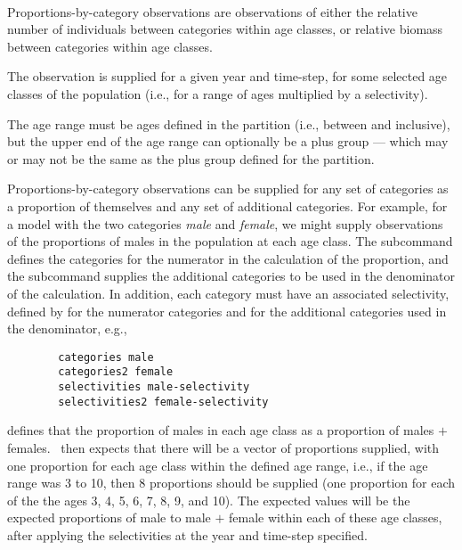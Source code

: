\paragraph*{\label{sec:proportions-by-category}}
Proportions-by-category observations are observations of either the relative number of individuals between categories within age classes, or relative biomass between categories within age classes. 

The observation is supplied for a given year and time-step, for some selected age classes of the population (i.e., for a range of ages multiplied by a selectivity).

The age range must be ages defined in the partition (i.e., between  and  inclusive), but the upper end of the age range can optionally be a plus group --- which may or may not be the same as the plus group defined for the partition. 

Proportions-by-category observations can be supplied for any set of categories as a proportion of themselves and any set of additional categories. For example, for a model with the two categories \emph{male} and \emph{female}, we might supply observations of the proportions of males in the population at each age class. The subcommand  defines the categories for the numerator in the calculation of the proportion, and the subcommand  supplies the additional categories to be used in the denominator of the calculation. In addition, each category must have an associated selectivity, defined by  for the numerator categories and  for the additional categories used in the denominator, e.g., 

{\small{\begin{verbatim}
		categories male
		categories2 female
		selectivities male-selectivity
		selectivities2 female-selectivity
		\end{verbatim}}}

defines that the proportion of males in each age class as a proportion of males $+$ females. \CNAME\ then expects that there will be a vector of proportions supplied, with one proportion for each age class within the defined age range, i.e., if the age range was 3 to 10, then 8 proportions should be supplied (one proportion for each of the the ages 3, 4, 5, 6, 7, 8, 9, and 10). The expected values will be the expected proportions of male to male $+$ female within each of these age classes, after applying the selectivities at the year and time-step specified. 

